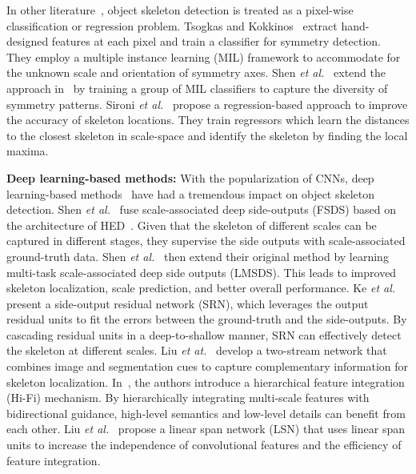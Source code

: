 \documentclass[10pt,twocolumn,letterpaper]{article}
\begin{document}
In other literature~\cite{tsogkas2012mil,shen2016misl,sironi2014multiscale}, object skeleton detection is treated as a pixel-wise classification or regression problem. Tsogkas and Kokkinos~\cite{tsogkas2012mil} extract hand-designed features at each pixel and train a classifier for symmetry detection. They employ a multiple instance learning (MIL) framework to accommodate for the unknown scale and orientation of symmetry axes. Shen {\em et al.}~\cite{shen2016misl} extend the approach in~\cite{tsogkas2012mil} by training a group of MIL classifiers to capture the diversity of symmetry patterns. Sironi {\em et al.}~\cite{sironi2014multiscale} propose a regression-based approach to improve the accuracy of skeleton locations. They train regressors which learn the distances to the closest skeleton in scale-space and identify the skeleton by finding the local maxima.

\medskip

\noindent\textbf{Deep learning-based methods:}
With the popularization of CNNs, deep learning-based methods~\cite{shen2016fsds,shen2017lmsds,ke2017srn,liu2017twostream,zhao2018hifi,liu2018lsn} have had a tremendous impact on object skeleton detection. Shen {\em et al.}~\cite{shen2016fsds} fuse scale-associated deep side-outputs (FSDS) based on the architecture of HED~\cite{xie2015hed}. Given that the skeleton of different scales can be captured in different stages, they supervise the side outputs with scale-associated ground-truth data. Shen {\em et al.}~\cite{shen2017lmsds} then extend their original method by learning multi-task scale-associated deep side outputs (LMSDS).
This leads to improved skeleton localization, scale prediction, and better overall performance. Ke {\em et al.}~\cite{ke2017srn} present a side-output residual network (SRN), which leverages the output residual units to fit the errors between the ground-truth and the side-outputs. By cascading residual units in a deep-to-shallow manner, SRN can effectively detect the skeleton at different scales. Liu {\em et at.}~\cite{liu2017twostream} develop a two-stream network that combines image and segmentation cues to capture complementary information for skeleton localization. In~\cite{zhao2018hifi}, the authors introduce a hierarchical feature integration (Hi-Fi) mechanism. By hierarchically integrating multi-scale features with bidirectional guidance, high-level semantics and low-level details can benefit from each other. Liu {\em et al.}~\cite{liu2018lsn} propose a linear span network (LSN) that uses linear span units to increase the independence of convolutional features and the efficiency of feature integration.
\end{document}

